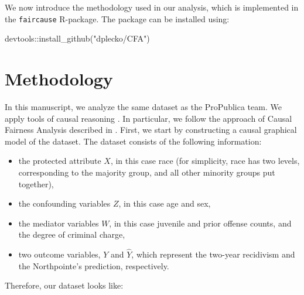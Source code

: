 \documentclass{article}
\newenvironment{Shaded}{\begin{snugshade}}{\end{snugshade}}
\newcommand{\FunctionTok}[1]{\textcolor[rgb]{0.00,0.00,0.00}{#1}}
\newcommand{\NormalTok}[1]{#1}
\newcommand{\SpecialCharTok}[1]{\textcolor[rgb]{0.00,0.00,0.00}{#1}}
\newcommand{\StringTok}[1]{\textcolor[rgb]{0.31,0.60,0.02}{#1}}
\providecommand{\tightlist}{%
  \setlength{\itemsep}{0pt}\setlength{\parskip}{0pt}}
\begin{document}
We now introduce the methodology used in our analysis, which is
implemented in the \texttt{faircause} R-package. The package can be
installed using:

\begin{Shaded}
\begin{Highlighting}[]
\NormalTok{devtools}\SpecialCharTok{::}\FunctionTok{install\_github}\NormalTok{(}\StringTok{"dplecko/CFA"}\NormalTok{)}
\end{Highlighting}
\end{Shaded}

\hypertarget{methodology}{%
\section{Methodology}\label{methodology}}

In this manuscript, we analyze the same dataset as the ProPublica team.
We apply tools of causal reasoning \cite{pearl:2k}. In particular, we
follow the approach of Causal Fairness Analysis described in
\cite{plecko2022causal}. First, we start by constructing a causal
graphical model of the dataset. The dataset consists of the following
information:

\begin{itemize}
\tightlist
\item
  the protected attribute \(X\), in this case race (for simplicity, race
  has two levels, corresponding to the majority group, and all other
  minority groups put together),
\item
  the confounding variables \(Z\), in this case age and sex,
\item
  the mediator variables \(W\), in this case juvenile and prior offense
  counts, and the degree of criminal charge,
\item
  two outcome variables, \(Y\) and \(\hat{Y}\), which represent the
  two-year recidivism and the Northpointe's prediction, respectively.
\end{itemize}

Therefore, our dataset looks like:
\end{document}
